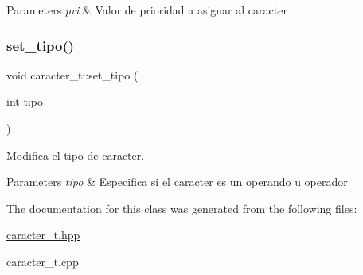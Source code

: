 \begin{DoxyParams}{Parameters}
{\em pri} & Valor de prioridad a asignar al caracter \\
\hline
\end{DoxyParams}
\mbox{\label{classcaracter__t_aed3d04cda835451c7fe7d752ffe1dc55}} 
\subsubsection{\texorpdfstring{set\+\_\+tipo()}{set\_tipo()}}
{\footnotesize\ttfamily void caracter\+\_\+t\+::set\+\_\+tipo (\begin{DoxyParamCaption}\item[{int}]{tipo }\end{DoxyParamCaption})}



Modifica el tipo de caracter. 


\begin{DoxyParams}{Parameters}
{\em tipo} & Especifica si el caracter es un operando u operador \\
\hline
\end{DoxyParams}


The documentation for this class was generated from the following files\+:\begin{DoxyCompactItemize}
\item 
\hyperlink{caracter__t_8hpp}{caracter\+\_\+t.\+hpp}\item 
caracter\+\_\+t.\+cpp\end{DoxyCompactItemize}
